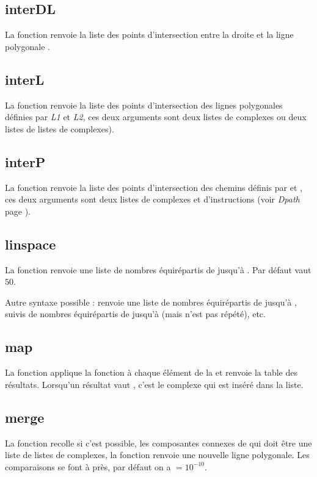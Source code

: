 \subsection{interDL}
La fonction  renvoie la liste des points d'intersection entre la droite  et la ligne polygonale .

\subsection{interL}
La fonction  renvoie la liste des points d'intersection des lignes polygonales définies par \emph{L1} et \emph{L2}, ces deux arguments sont deux listes de complexes ou deux listes de listes de complexes).

\subsection{interP}
La fonction  renvoie la liste des points d'intersection des chemins définis par  et , ces deux arguments sont deux listes de complexes et d'instructions (voir \emph{Dpath} page \pageref{Dpath}).


\subsection{linspace}
La fonction  renvoie une liste de  nombres équirépartis de  jusqu'à . Par défaut  vaut $50$.

Autre syntaxe possible :  renvoie une liste de  nombres équirépartis de  jusqu'à , suivis de  nombres équirépartis de  jusqu'à  (mais  n'est pas répété), etc.

\subsection{map}
La fonction  applique la fonction  à chaque élément de la  et renvoie la table des résultats. Lorsqu'un résultat vaut \nil, c'est le complexe  qui est inséré dans la liste.

\subsection{merge}
La fonction  recolle si c'est possible, les composantes connexes de  qui doit être une liste de listes de complexes, la fonction renvoie une nouvelle ligne polygonale. Les comparaisons se font à  près, par défaut on a $=10^{-10}$.

